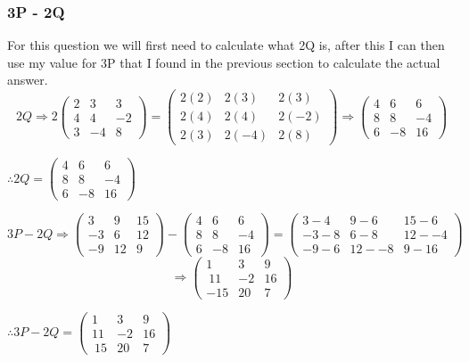 \documentclass{article}
\begin{document}
\subsubsection{3P - 2Q}

For this question we will first need to calculate what 2Q is, after this I can then use my value for 3P that I found in the previous section to calculate the actual answer.
\[
	2Q \Rightarrow 2
	\begin{pmatrix}
		2 & 3 & 3\\
		4 & 4 & -2\\
		3 & -4 & 8
	\end{pmatrix}
	=
	\begin{pmatrix}
		2(2) & 2(3) & 2(3)\\
		2(4) & 2(4) & 2(-2)\\
		2(3) & 2(-4) & 2(8)
	\end{pmatrix}
	\Rightarrow
	\begin{pmatrix}
		4 & 6 & 6\\
		8 & 8 & -4\\
		6 & -8 & 16
	\end{pmatrix}
\]
\begin{center}\vspace{0.5cm}$\therefore 2Q=\begin{pmatrix} 4 & 6 & 6\\ 8 & 8 & -4\\ 6 & -8 & 16\end{pmatrix}$\end{center}
\[
	3P-2Q
	\Rightarrow
	\begin{pmatrix}
		3 & 9 & 15\\
		-3 & 6 & 12\\
		-9 & 12 & 9
	\end{pmatrix}
	-
	\begin{pmatrix}
		4 & 6 & 6\\
		8 & 8 & -4\\
		6 & -8 & 16
	\end{pmatrix}
	=
	\begin{pmatrix}
		3-4 & 9-6 & 15-6\\
		-3-8 & 6-8 & 12--4\\
		-9-6 & 12--8 & 9-16
	\end{pmatrix}
\]
\[
	\Rightarrow
	\begin{pmatrix}
		1 & 3 & 9\\
		~11 & -2 & 16\\
		-15 & 20 & 7
	\end{pmatrix}
\]
\begin{center}\vspace{0.5cm}$\therefore 3P-2Q=\begin{pmatrix} 1 & 3 & 9\\ 11 & -2 & 16\\ ~15 & 20 & 7\end{pmatrix}$\end{center}
\end{document}
